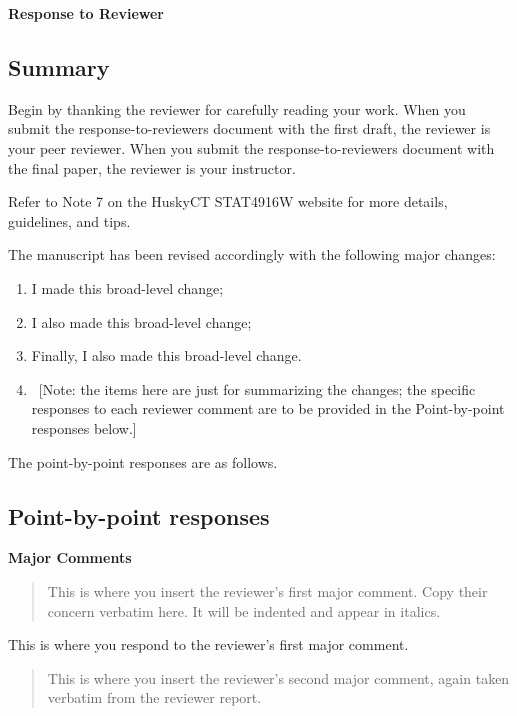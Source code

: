 \documentclass[12pt]{article}
\newenvironment{comment}%
{\begin{quotation}\small\it\noindent\ignorespaces%
}{\end{quotation}}
\begin{document}
\begin{center} \Large \bf
  Response to Reviewer
\end{center}

\subsection*{Summary}

Begin by thanking the reviewer for carefully reading your work. When 
you submit the response-to-reviewers document with the first draft, 
the reviewer is your peer reviewer. When you submit the 
response-to-reviewers document with the final paper, the reviewer is your 
instructor.  

Refer to Note 7 on the HuskyCT STAT4916W website for more details, guidelines, 
and tips.

The manuscript has been revised accordingly with the following major changes:
\begin{enumerate}
\item I made this broad-level change;
\item I also made this broad-level change;
\item Finally, I also made this broad-level change.  
\item ~[Note: the items here are just for summarizing the changes; the 
specific responses to each reviewer comment are to be provided in the 
Point-by-point responses below.]
\end{enumerate}

The point-by-point responses are as follows.

\subsection*{Point-by-point responses}

\textbf{Major Comments}

\begin{comment}
	This is where you insert the reviewer's first major comment. Copy their 
	concern verbatim here. It will be indented and appear in italics.
\end{comment}


This is where you respond to the reviewer's first major comment.


\begin{comment}
	This is where you insert the reviewer's second major comment, again  
	taken verbatim from the reviewer report.  
\end{comment}
\end{document}
